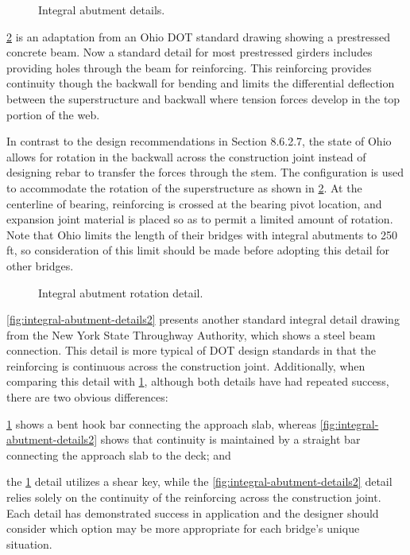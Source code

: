 \begin{figure}
  \caption{Integral abutment details.}
  \label{fig:integral-abutment-details}
\end{figure}

\cref{fig:integral-abutment-rotation-detail} is an adaptation from an Ohio DOT standard drawing showing a prestressed concrete beam. Now a
standard detail for most prestressed girders includes providing holes through the beam for reinforcing.
 This
reinforcing provides continuity though the backwall for bending and limits the differential deflection between the
superstructure and backwall where tension forces develop in the top portion of the web.

In contrast to the design recommendations in Section 8.6.2.7, the state of Ohio allows for rotation in the backwall
across the construction joint instead of designing rebar to transfer the forces through the stem. The configuration is
used to accommodate the rotation of the superstructure as shown in \cref{fig:integral-abutment-rotation-detail}. At the centerline of bearing,
reinforcing is crossed at the bearing pivot location, and expansion joint material is placed so as to permit a limited
amount of rotation.
 Note that Ohio limits the length of their bridges with integral abutments to 250 ft, so
consideration of this limit should be made before adopting this detail for other bridges.

\begin{figure}
  \caption{ Integral abutment rotation detail.}
  \label{fig:integral-abutment-rotation-detail}
\end{figure}

\cref{fig:integral-abutment-details2} presents another standard integral detail drawing from the New York State Throughway Authority,
which shows a steel beam connection. This detail is more typical of DOT design standards in that the reinforcing is
continuous across the construction joint. Additionally, when comparing this detail with \cref{fig:integral-abutment-details}, although both
details have had repeated success, there are two obvious differences: 
\begin{enumerate*}
  \item \cref{fig:integral-abutment-details} shows a bent hook bar connecting the approach slab, whereas \cref{fig:integral-abutment-details2} shows that continuity is maintained by a straight bar connecting the approach slab to the deck; and 
  \item the \cref{fig:integral-abutment-details} detail utilizes a shear key, while the \cref{fig:integral-abutment-details2} detail relies solely on the continuity of the reinforcing across the construction joint. Each detail has demonstrated success in application and the designer should consider which option may be more appropriate for each bridge’s unique situation.
\end{enumerate*}

